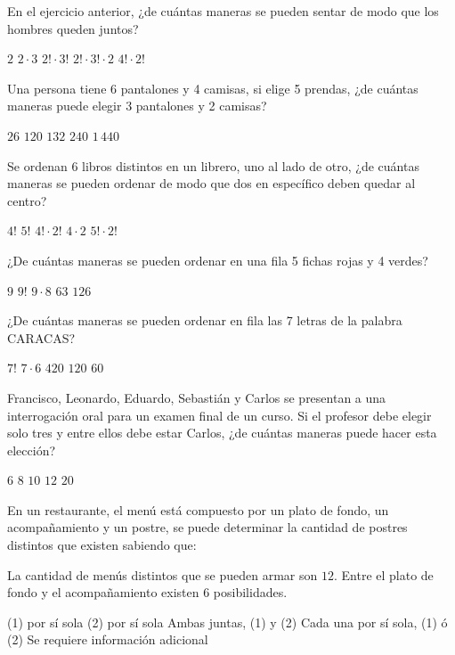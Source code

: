 \documentclass[sin nombre]{srs}
\begin{document}
\begin{preguntas}[after-item-skip=2cm]
\pregunta En el ejercicio anterior, ¿de cuántas maneras se pueden sentar de modo que los hombres queden juntos?
\begin{vertical}
\alternativa $2$
\alternativa $2 \cdot 3$
\alternativa $2! \cdot 3!$
\alternativa $2! \cdot 3! \cdot 2$
\alternativa $4! \cdot 2!$
\end{vertical}

\pregunta Una persona tiene 6 pantalones y 4 camisas, si elige 5 prendas, ¿de cuántas maneras puede elegir 3 pantalones y 2 camisas?
\begin{vertical}
\alternativa $26$
\alternativa $120$
\alternativa $132$
\alternativa $240$
\alternativa $1\,440$
\end{vertical}

\pregunta Se ordenan 6 libros distintos en un librero, uno al lado de otro, ¿de cuántas maneras se pueden ordenar de modo que dos en específico deben quedar al centro?
\begin{vertical}
\alternativa $4!$
\alternativa $5!$
\alternativa $4! \cdot 2!$
\alternativa $4 \cdot 2$
\alternativa $5! \cdot 2!$
\end{vertical}

\pregunta ¿De cuántas maneras se pueden ordenar en una fila 5 fichas rojas y 4 verdes?
\begin{vertical}
\alternativa $9$
\alternativa $9!$
\alternativa $9 \cdot 8$
\alternativa $63$
\alternativa $126$
\end{vertical}

\pregunta ¿De cuántas maneras se pueden ordenar en fila las 7 letras de la palabra CARACAS?
\begin{vertical}
\alternativa $7!$
\alternativa $7 \cdot 6$
\alternativa $420$
\alternativa $120$
\alternativa $60$
\end{vertical}

\pregunta Francisco, Leonardo, Eduardo, Sebastián y Carlos se presentan a una interrogación oral para un examen final de un curso. Si el profesor debe elegir solo tres y entre ellos debe estar Carlos, ¿de cuántas maneras puede hacer esta elección?
\begin{vertical}
\alternativa $6$
\alternativa $8$
\alternativa $10$
\alternativa $12$
\alternativa $20$
\end{vertical}

\pregunta En un restaurante, el menú está compuesto por un plato de fondo, un acompañamiento y un postre, se puede determinar la cantidad de postres distintos que existen sabiendo que:
\begin{verticaln}
\alternativa La cantidad de menús distintos que se pueden armar son $12$.
\alternativa Entre el plato de fondo y el acompañamiento existen $6$ posibilidades.
\end{verticaln}
\begin{vertical}
\alternativa (1) por sí sola
\alternativa (2) por sí sola
\alternativa Ambas juntas, (1) y (2)
\alternativa Cada una por sí sola, (1) ó (2)
\alternativa Se requiere información adicional
\end{vertical}


\end{preguntas}
\end{document}
